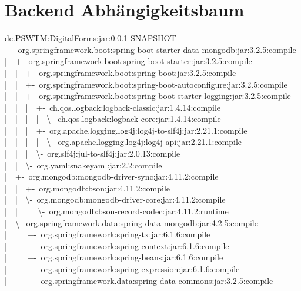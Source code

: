 \section{Backend Abhängigkeitsbaum}\label{sec:backend-abhangigkeitsbaum}
de.PSWTM:DigitalForms:jar:0.0.1-SNAPSHOT\\
+-~org.springframework.boot:spring-boot-starter-data-mongodb:jar:3.2.5:compile\\
|~~+-~org.springframework.boot:spring-boot-starter:jar:3.2.5:compile\\
|~~|~~+-~org.springframework.boot:spring-boot:jar:3.2.5:compile\\
|~~|~~+-~org.springframework.boot:spring-boot-autoconfigure:jar:3.2.5:compile\\
|~~|~~+-~org.springframework.boot:spring-boot-starter-logging:jar:3.2.5:compile\\
|~~|~~|~~+-~ch.qos.logback:logback-classic:jar:1.4.14:compile\\
|~~|~~|~~|~~\textbackslash-~ch.qos.logback:logback-core:jar:1.4.14:compile\\
|~~|~~|~~+-~org.apache.logging.log4j:log4j-to-slf4j:jar:2.21.1:compile\\
|~~|~~|~~|~~\textbackslash-~org.apache.logging.log4j:log4j-api:jar:2.21.1:compile\\
|~~|~~|~~\textbackslash-~org.slf4j:jul-to-slf4j:jar:2.0.13:compile\\
|~~|~~\textbackslash-~org.yaml:snakeyaml:jar:2.2:compile\\
|~~+-~org.mongodb:mongodb-driver-sync:jar:4.11.2:compile\\
|~~|~~+-~org.mongodb:bson:jar:4.11.2:compile\\
|~~|~~\textbackslash-~org.mongodb:mongodb-driver-core:jar:4.11.2:compile\\
|~~|~~~~~\textbackslash-~org.mongodb:bson-record-codec:jar:4.11.2:runtime\\
|~~\textbackslash-~org.springframework.data:spring-data-mongodb:jar:4.2.5:compile\\
|~~~~~+-~org.springframework:spring-tx:jar:6.1.6:compile\\
|~~~~~+-~org.springframework:spring-context:jar:6.1.6:compile\\
|~~~~~+-~org.springframework:spring-beans:jar:6.1.6:compile\\
|~~~~~+-~org.springframework:spring-expression:jar:6.1.6:compile\\
|~~~~~+-~org.springframework.data:spring-data-commons:jar:3.2.5:compile\\
